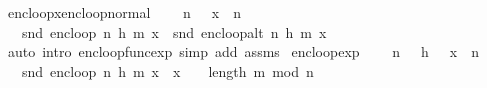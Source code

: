 \begin{isabellebody}
\endisatagproof
{\isafoldproof}%
%
\isadelimproof
\isanewline
%
\endisadelimproof
\isanewline
{}\isamarkupfalse%
\ enc{\isacharunderscore}{\kern0pt}loop{\isacharunderscore}{\kern0pt}x{\isacharunderscore}{\kern0pt}enc{\isacharunderscore}{\kern0pt}loop{\isacharunderscore}{\kern0pt}normal{\isacharcolon}{\kern0pt}\ \isanewline
\ \ \ {\isachardoublequoteopen}n\ {\isachargreater}{\kern0pt}\ {}{\isachardoublequoteclose}\ {\isachardoublequoteopen}x\ {\isacharless}{\kern0pt}\ n{\isachardoublequoteclose}\isanewline
\ \ \ {\isachardoublequoteopen}snd\ {\isacharparenleft}{\kern0pt}enc{\isacharunderscore}{\kern0pt}loop\ {\isacharparenleft}{\kern0pt}n{\isacharcomma}{\kern0pt}\ h{\isacharcomma}{\kern0pt}\ m{\isacharparenright}{\kern0pt}\ x{\isacharparenright}{\kern0pt}\ {\isacharequal}{\kern0pt}\ snd\ {\isacharparenleft}{\kern0pt}enc{\isacharunderscore}{\kern0pt}loop{\isacharunderscore}{\kern0pt}alt\ {\isacharparenleft}{\kern0pt}n{\isacharcomma}{\kern0pt}\ h{\isacharcomma}{\kern0pt}\ m{\isacharparenright}{\kern0pt}\ x{\isacharparenright}{\kern0pt}{\isachardoublequoteclose}\isanewline
%
\isadelimproof
\ \ %
\endisadelimproof
%
\isatagproof
{}\isamarkupfalse%
\ {\isacharparenleft}{\kern0pt}auto\ intro{\isacharcolon}{\kern0pt}\ enc{\isacharunderscore}{\kern0pt}loop{\isacharunderscore}{\kern0pt}func{\isacharunderscore}{\kern0pt}exp\ simp\ add{\isacharcolon}{\kern0pt}\ assms{\isacharparenright}{\kern0pt}%
\endisatagproof
{\isafoldproof}%
%
\isadelimproof
\isanewline
%
\endisadelimproof
\isanewline
{}\isamarkupfalse%
\ enc{\isacharunderscore}{\kern0pt}loop{\isacharunderscore}{\kern0pt}exp{\isacharcolon}{\kern0pt}\ \isanewline
\ \ \ {\isachardoublequoteopen}n\ {\isachargreater}{\kern0pt}\ {}{\isachardoublequoteclose}\ {\isachardoublequoteopen}h\ {\isachargreater}{\kern0pt}\ {}{\isachardoublequoteclose}\ {\isachardoublequoteopen}x\ {\isacharless}{\kern0pt}\ n{\isachardoublequoteclose}\isanewline
\ \ \ {\isachardoublequoteopen}snd\ {\isacharparenleft}{\kern0pt}enc{\isacharunderscore}{\kern0pt}loop\ {\isacharparenleft}{\kern0pt}n{\isacharcomma}{\kern0pt}\ h{\isacharcomma}{\kern0pt}\ m{\isacharparenright}{\kern0pt}\ x{\isacharparenright}{\kern0pt}\ {\isacharequal}{\kern0pt}\ x\ {\isacharcircum}{\kern0pt}\ {\isacharparenleft}{\kern0pt}{}\ {\isacharcircum}{\kern0pt}\ {\isacharparenleft}{\kern0pt}length\ m{\isacharparenright}{\kern0pt}{\isacharparenright}{\kern0pt}\ mod\ n{\isachardoublequoteclose}\isanewline

\end{isabellebody}
